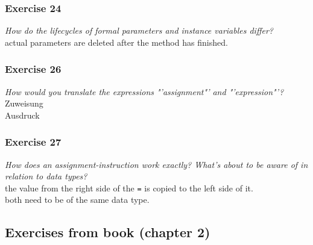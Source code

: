 \subsubsection*{Exercise 24}
\textit{How do the lifecycles of formal parameters and instance variables 
	differ?}\\
actual parameters are deleted after the method has finished. 

\subsubsection*{Exercise 26}
\textit{How would you translate the expressions "'assignment"' and 
	"'expression"'?}\\
Zuweisung \\
Ausdruck

\subsubsection*{Exercise 27}
\textit{How does an assignment-instruction work exactly? What's about to 
	be aware of in relation to data types?}\\
the value from the right side of the \lstinline{=} is copied to the left side of it. 
\\
both need to be of the same data type. 

\subsection{Exercises from book (chapter 2)}
